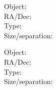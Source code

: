 \bigskip\noindent 

\parbox[b]{8cm}{ Object: \makebox[3cm]{\hrulefill}\\
RA/Dec: \makebox[3cm]{\hrulefill} \\
Type: \makebox[3cm]{\hrulefill} \\
Size/separation:  \makebox[1.5cm]{\hrulefill} \\ }   \begin{minipage}[b]{8cm}{}\end{minipage}

\bigskip\noindent 

\parbox[b]{8cm}{ Object: \makebox[3cm]{\hrulefill}\\
RA/Dec: \makebox[3cm]{\hrulefill} \\
Type: \makebox[3cm]{\hrulefill} \\
Size/separation:  \makebox[1.5cm]{\hrulefill} \\ }   \begin{minipage}[b]{8cm}{}\end{minipage}

\bigskip\noindent 


